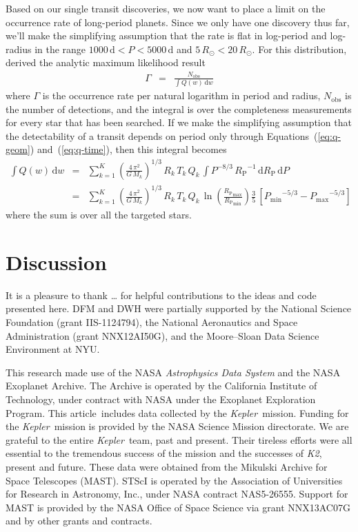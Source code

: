 \documentclass[12pt,preprint]{aastex}
\newcommand{\project}[1]{\textsl{#1}}
\newcommand{\kepler}{\project{Kepler}}
\newcommand{\KT}{\project{K2}}
\newcommand{\paper}{article}
\renewcommand{\eqref}[1]{\ref{eq:#1}}
\newcommand{\sectlabel}[1]{\label{sect:#1}}
\newcommand{\dd}{\ensuremath{\,\mathrm{d}}}
\newcommand{\period}{{\ensuremath{P}}}
\newcommand{\rp}{{\ensuremath{R_\mathrm{P}}}}
\newcommand{\rate}{{\ensuremath{\Gamma}}}
\begin{document}
Based on our single transit discoveries, we now want to place a limit on
the occurrence rate of long-period planets.
Since we only have one discovery thus far, we'll make the simplifying
assumption that the rate is flat in log-period and log-radius in the range
$1000\,\mathrm{d} < \period < 5000\,\mathrm{d}$ and $5\,R_\odot <
20\,R_\odot$.
For this distribution, \citet{Foreman-Mackey:2014} derived the analytic
maximum likelihood result
\begin{eqnarray}
\rate &=& \frac{N_\mathrm{obs}}{\int Q(w)\dd w}
\end{eqnarray}
where $\rate$ is the occurrence rate per natural logarithm in period and
radius, $N_\mathrm{obs}$ is the number of detections, and the integral is over
the completeness measurements for every star that has been searched.
If we make the simplifying assumption that the detectability of a transit
depends on period only through Equations~(\eqref{q-geom})
and~(\eqref{q-time}), then this integral becomes
\begin{eqnarray}
\int Q(w)\dd w &=& \sum_{k=1}^K
    \left( \frac{4\,\pi^2}{G\,M_k} \right)^{1/3} \, R_k \, T_k \, Q_k \,
    \int \period^{-8/3}\,\rp^{-1} \dd\rp\dd\period \\
 &=& \sum_{k=1}^K
    \left( \frac{4\,\pi^2}{G\,M_k} \right)^{1/3} \, R_k \, T_k \, Q_k \,
    \ln \left(\frac{\rp_\mathrm{max}}{\rp_\mathrm{min}}\right)
    \frac{3}{5} \,
    \left[{\period_\mathrm{min}}^{-5/3} - {\period_\mathrm{max}}^{-5/3}\right]
\end{eqnarray}
where the sum is over all the targeted stars.


\section{Discussion}\sectlabel{discussion}


\acknowledgments
It is a pleasure to thank
\ldots
for helpful contributions to the ideas and code presented here.
DFM and DWH were partially supported by the National Science Foundation
(grant IIS-1124794),
the National Aeronautics and Space Administration
(grant NNX12AI50G), and the Moore--Sloan Data Science Environment at NYU.

This research made use of the NASA \project{Astrophysics Data System} and the
NASA Exoplanet Archive.
The Archive is operated by the California Institute of Technology, under
contract with NASA under the Exoplanet Exploration Program.
This \paper\ includes data collected by the \kepler\ mission. Funding for the
\kepler\ mission is provided by the NASA Science Mission directorate.
We are grateful to the entire \kepler\ team, past and present.
Their tireless efforts were all essential to the tremendous success of the mission
and the successes of \KT, present and future.
These data were obtained from the Mikulski Archive for Space Telescopes
(MAST).
STScI is operated by the Association of Universities for Research in
Astronomy, Inc., under NASA contract NAS5-26555.
Support for MAST is provided by the NASA Office of Space Science via grant
NNX13AC07G and by other grants and contracts.
\end{document}
